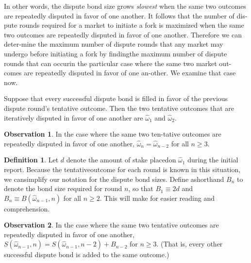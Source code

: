 \documentclass[12pt,floatfix,reprint,nofootinbib,amsmath,amssymb,epsfig,pre,floats,letterpaper,groupedaffiliation]{revtex4-1}
\theoremstyle{definition}
\newtheorem{observation}{Observation}
\theoremstyle{definition}
\newtheorem{definition}{Definition}
\begin{document}
In other words, the dispute bond size grows \textit{slowest} when the same two outcomes are repeatedly disputed in favor of one another. It follows that the number of dis-\linebreak pute rounds required for a market to initiate a fork is maximized when the same two outcomes are repeatedly disputed in favor of one another. Therefore we can deter-\linebreak mine the maximum number of dispute rounds that any market may undergo before initiating a fork by finding\linebreak the maximum number of dispute rounds that can occur\linebreak in the particular case where the same two market out-\linebreak comes are repeatedly disputed in favor of one an-\linebreak other. We examine that case now.

Suppose that every successful dispute bond is filled in favor of the previous dispute round's tentative outcome. Then the two tentative outcomes that are iteratively disputed in favor of one another are $\hat{\omega}_1$ and $\hat{\omega}_2$.

\begin{observation}
In the case where the same two ten-\linebreak tative outcomes are repeatedly disputed in favor of one another, $\hat{\omega}_n = \hat{\omega}_{n-2}$ for all $n \geq 3$.
\end{observation}

\begin{definition}
Let $d$ denote the amount of stake placed\linebreak on $\hat{\omega}_1$ during the initial report. Because the tentative\linebreak outcome for each round is known in this situation, we can\linebreak simplify our notation for the dispute bond sizes. Define a\linebreak shorthand $B_n$ to denote the bond size required for round $n$, so that $B_1 \equiv 2d$ and $B_n \equiv B(\hat{\omega}_{n-1}, n)$ for all $n \geq 2$. This will make for easier reading and comprehension.
\end{definition}

\begin{observation}
In the case where the same two tentative outcomes are repeatedly disputed in favor of one another, $S(\hat{\omega}_{n-1}, n) = S(\hat{\omega}_{n-1}, n-2) + B_{n-2}$ for $n \geq 3$. (That is, every other successful dispute bond is added to the same outcome.)
\end{observation}
\end{document}
